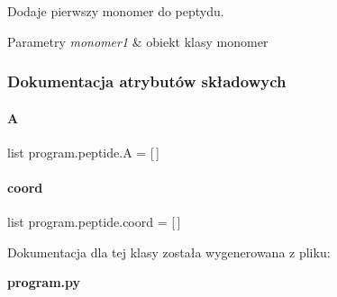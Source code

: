 Dodaje pierwszy monomer do peptydu. 


\begin{DoxyParams}{Parametry}
{\em monomer1} & obiekt klasy monomer \\
\hline
\end{DoxyParams}


\subsubsection{Dokumentacja atrybutów składowych}
\mbox{\label{classprogram_1_1peptide_a16cef0faa25c5ff35af13fae940bc386}} 
\paragraph{A}
{\footnotesize\ttfamily list program.\+peptide.\+A = [$\,$]\hspace{0.3cm}{\ttfamily [static]}}

\mbox{\label{classprogram_1_1peptide_a994ed7cb1479fd7419e26d6a4e35d056}} 
\paragraph{coord}
{\footnotesize\ttfamily list program.\+peptide.\+coord = [$\,$]\hspace{0.3cm}{\ttfamily [static]}}



Dokumentacja dla tej klasy została wygenerowana z pliku\+:\begin{DoxyCompactItemize}
\item 
\textbf{ program.\+py}\end{DoxyCompactItemize}
